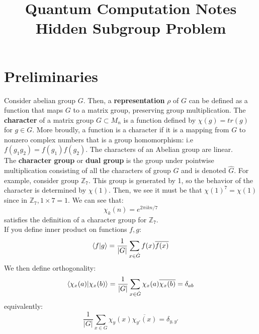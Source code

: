 \documentclass{article}
\title{Quantum Computation Notes \\ \large Hidden Subgroup Problem}
\author{}
\date{}
\begin{document}
\maketitle
\section{Preliminaries}
Consider abelian group $G$. Then, a \textbf{representation} $\rho$ of $G$ can be defined as a function that maps $G$ to a matrix group, preserving group multiplication. The \textbf{character} of a matrix group $G \subset M_n$ is a function defined by $\chi(g) = tr(g)$ for $g \in G$. More broudly, a function is a character if it is a mapping from $G$ to nonzero complex numbers that is a group homomorphism: i.e $f(g_1 g_2) = f(g_1) f(g_2)$. The characters of an Abelian group are linear.\\
The \textbf{character group} or \textbf{dual group} is the group under pointwise multiplication consisting of all the characters of group $G$ and is denoted $\hat{G}$. For example, consider group $\mathbb{Z}_7$. This group is generated by 1, so the behavior of the character is determined by $\chi(1)$. Then, we see it must be that $\chi(1)^7 = \chi(1)$ since in $\mathbb{Z}_7, 1 \times 7 = 1$. We can see that:
$$\chi_k(n) = e^{2\pi i kn/7}$$
satisfies the definition of a character group for $\mathbb{Z}_7$.\\
If you define inner product on functions $f,g$:
$$\braket{f|g} = \frac{1}{|G|} \sum_{x \in \hat{G}} f(x) \overline{f(x)}$$
We then define orthogonality:
$$\braket{\chi_x(a)|\chi_x(b)} = \frac{1}{|G|} \sum_{x \in \hat{G}} \chi_x(a) \overline{\chi_x(b)} = \delta_{ab}$$
equivalently:
$$\frac{1}{|G|} \sum_{x \in G} \chi_y(x) \overline{\chi_{y'} (x)} = \delta_{y, y'}$$
\end{document}
